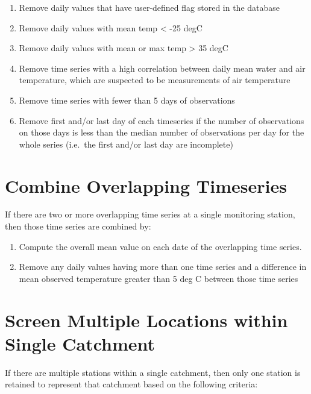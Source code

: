 \documentclass[]{book}
\providecommand{\tightlist}{%
  \setlength{\itemsep}{0pt}\setlength{\parskip}{0pt}}
\begin{document}
\begin{enumerate}
\def\labelenumi{\arabic{enumi}.}
\tightlist
\item
  Remove daily values that have user-defined flag stored in the database
\item
  Remove daily values with mean temp \textless{} -25 degC
\item
  Remove daily values with mean or max temp \textgreater{} 35 degC
\item
  Remove time series with a high correlation between daily mean water and air temperature, which are suspected to be measurements of air temperature
\item
  Remove time series with fewer than 5 days of observations
\item
  Remove first and/or last day of each timeseries if the number of observations on those days is less than the median number of observations per day for the whole series (i.e.~the first and/or last day are incomplete)
\end{enumerate}

\hypertarget{combine-overlapping-timeseries}{%
\section{Combine Overlapping Timeseries}\label{combine-overlapping-timeseries}}

If there are two or more overlapping time series at a single monitoring station, then those time series are combined by:

\begin{enumerate}
\def\labelenumi{\arabic{enumi}.}
\tightlist
\item
  Compute the overall mean value on each date of the overlapping time series.
\item
  Remove any daily values having more than one time series and a difference in mean observed temperature greater than 5 deg C between those time series
\end{enumerate}

\hypertarget{screen-multiple-locations-within-single-catchment}{%
\section{Screen Multiple Locations within Single Catchment}\label{screen-multiple-locations-within-single-catchment}}

If there are multiple stations within a single catchment, then only one station is retained to represent that catchment based on the following criteria:
\end{document}
